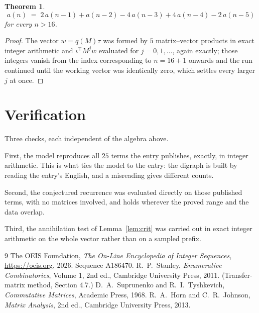 \documentclass[11pt,a4paper]{article}
\theoremstyle{plain}
\newtheorem{theorem}{Theorem}
\theoremstyle{definition}
\begin{document}
\begin{theorem}
\[
a(n)\;=\;2\,a(n-1) + a(n-2) - 4\,a(n-3) + 4\,a(n-4) - 2\,a(n-5)
\]
for every $n>16$.
\end{theorem}

\begin{proof}
The vector $w=q(M)\tau$ was formed by $5$ matrix--vector products in exact integer
arithmetic and $\iota^{\!\top}M^{j}w$ evaluated for $j=0,1,\dots$, again exactly; those
integers vanish from the index corresponding to $n=16+1$ onwards and the run continued
until the working vector was identically zero, which settles every larger $j$ at once.
\end{proof}

\section{Verification}

Three checks, each independent of the algebra above.

First, the model reproduces all $25$ terms the entry publishes, exactly, in integer
arithmetic. This is what ties the model to the entry: the digraph is built by reading the
entry's English, and a misreading gives different counts.

Second, the conjectured recurrence was evaluated directly on those published terms, with no
matrices involved, and holds wherever the proved range and the data overlap.

Third, the annihilation test of Lemma~\ref{lem:crit} was carried out in exact integer
arithmetic on the whole vector rather than on a sampled prefix.

\begin{thebibliography}{9}
 The OEIS Foundation, \emph{The On-Line Encyclopedia of Integer
Sequences}, \url{https://oeis.org}, 2026. Sequence A186470.
 R.~P.~Stanley, \emph{Enumerative Combinatorics}, Volume 1, 2nd ed.,
Cambridge University Press, 2011. (Transfer-matrix method, Section 4.7.)
 D.~A.~Suprunenko and R.~I.~Tyshkevich, \emph{Commutative Matrices},
Academic Press, 1968.
 R.~A.~Horn and C.~R.~Johnson, \emph{Matrix Analysis}, 2nd ed., Cambridge
University Press, 2013.
\end{thebibliography}
\end{document}

